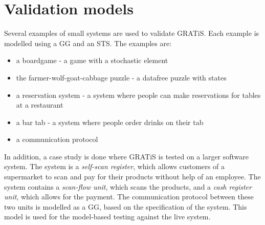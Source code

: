 \section{Validation models}

Several examples of small systems are used to validate GRATiS. Each example is modelled using a GG and an STS. The examples are:
\begin{itemize}
\item a boardgame - a game with a stochastic element
\item the farmer-wolf-goat-cabbage puzzle - a datafree puzzle with states
\item a reservation system - a system where people can make reservations for tables at a restaurant
\item a bar tab - a system where people order drinks on their tab
\item a communication protocol
\end{itemize}

In addition, a case study is done where GRATiS is tested on a larger software system. The system is a \textit{self-scan register}, which allows customers of a supermarket to scan and pay for their products without help of an employee. The system contains a \textit{scan-flow unit}, which scans the products, and a \textit{cash register unit}, which allows for the payment. The communication protocol between these two units is modelled as a GG, based on the specification of the system. This model is used for the model-based testing against the live system.
